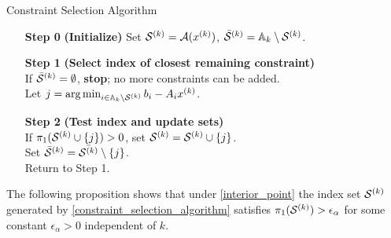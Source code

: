 \documentclass{article}
\begin{document}
{
\begin{fullwidth}[leftmargin=0in, rightmargin=0in, width=\linewidth-0.5in]
\begin{flushleft}

\begin{algorithm}[H]
    \caption{Constraint Selection Algorithm \label{constraint_selection_algorithm} }
    \begin{itemize}
        \item[\textbf{Step 0}] \textbf{(Initialize)} Set $\mathcal{S}^{(k)} = {\mathcal A}(x^{(k)})$, $\bar{\mathcal{S}}^{(k)} = {\mathbb A_{k}} \setminus \mathcal{S}^{(k)}$.   \\
	\item[\textbf{Step 1}] \textbf{(Select index of closest remaining constraint)} \\
			If $\bar{\mathcal{S}}^{(k)} = \emptyset$, \textbf{stop};  no more constraints can be added.\\
		    Let $j=\operatorname*{arg\,min}_{i \in {\mathbb A_{k}} \setminus \mathcal{S}^{(k)}} b_i-A_i x^{(k)}$. \\
   \item[\textbf{Step 2}] \textbf{(Test index and update sets)}\\ 
       			If $\pi_1(\mathcal{S}^{(k)} \cup \{j\}) > 0$,  set $\mathcal{S}^{(k)} = \mathcal{S}^{(k)} \cup \{ j\}$. \\
       			Set $\bar{\mathcal{S}}^{(k)} = \bar{\mathcal{S}^{(k)}} \setminus \{j\}$. \\
       			Return to Step 1.
    \end{itemize}
\end{algorithm}

\end{flushleft}
\end{fullwidth}
}
The following proposition shows that under \cref{interior_point} the index set $\mathcal{S}^{(k)}$ generated by \cref{constraint_selection_algorithm} satisfies ${\pi_1}(\mathcal{S}^{(k)}) > \epsilon_{\alpha}$
 for some constant $\epsilon_{\alpha}>0$ independent of $k$. 
\end{document}
